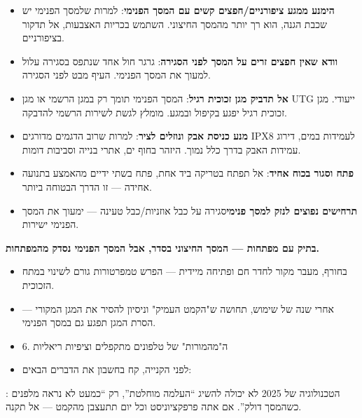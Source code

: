 \begin{itemize}
  \item \textbf{הימנע ממגע ציפורניים/חפצים קשים עם המסך הפנימי}: למרות שלמסך הפנימי יש שכבת הגנה, הוא רך יותר מהמסך החיצוני. השתמש בכריות האצבעות, אל תדקור בציפורניים.
  \item \textbf{וודא שאין חפצים זרים על המסך לפני הסגירה}: גרגר חול אחד שנתפס בסגירה עלול למעוך את המסך הפנימי. העיף מבט לפני הסגירה.
  \item \textbf{אל תדביק מגן זכוכית רגיל}: המסך הפנימי תומך רק במגן הרשמי או מגן UTG ייעודי. מגן זכוכית רגיל יפגע בקיפול ובמגע. מומלץ לגשת לשירות הרשמי להדבקה.
  \item \textbf{מנע כניסת אבק ונוזלים לציר}: למרות שרוב הדגמים מדורגים IPX8 לעמידות במים, דירוג עמידות האבק בדרך כלל נמוך. היזהר בחוף ים, אתרי בנייה וסביבות דומות.
  \item \textbf{פתח וסגור בכוח אחיד}: אל תפתח בטריקה ביד אחת, פתח בשתי ידיים מהאמצע בתנועה אחידה — זו הדרך הבטוחה ביותר.
  \item \textbf{תרחישים נפוצים לנזק למסך פנימי}סגירה על כבל אוזניות/כבל טעינה — ימעוך את המסך הפנימי ישירות.
\end{itemize}

\textbf{בתיק עם מפתחות — המסך החיצוני בסדר, אבל המסך הפנימי נסדק מהמפתחות.}\par

\begin{itemize}
  \item בחורף, מעבר מקור לחדר חם ופתיחה מיידית — הפרש טמפרטורות גורם לשינוי במתח הזכוכית.
  \item אחרי שנה של שימוש, תחושה ש"הקמט העמיק" וניסיון להסיר את המגן המקורי — הסרת המגן תפגע גם במסך הפנימי.
  \item 6. ה"מהמורות" של טלפונים מתקפלים וציפיות ריאליות
  \item לפני הקנייה, קח בחשבון את הדברים הבאים:
\end{itemize}


: הטכנולוגיה של 2025 לא יכולה להשיג “העלמה מוחלטת”, רק “כמעט לא נראה מלפנים כשהמסך דולק”. אם אתה פרפקציוניסט וכל יום תתעצבן מהקמט — אל תקנה.

